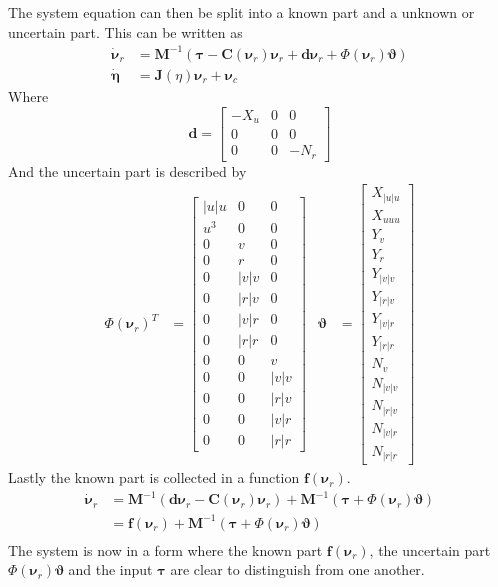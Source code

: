 \documentclass[12pt,a4]{article}
\begin{document}
The system equation can then be split into a known part and a unknown or uncertain part. This can be written as
\begin{align}
	\bm{\dot{\nu}}_r & = \bm{M}^{-1} (\bm{\tau} -\bm{C}(\bm{\nu}_r)\bm{\nu}_r + \bm{d} \bm{\nu}_r + \Phi(\bm{\nu}_r )\bm{\vartheta}) \\
	\bm{\dot{\eta}}  & = \bm{J}(\eta)\bm{\nu}_r + \bm{\nu}_c
\end{align}
Where
\begin{equation}
	\bm{d} = \begin{bmatrix}
		-X_u & 0 & 0    \\
		0    & 0 & 0    \\
		0    & 0 & -N_r
	\end{bmatrix}
\end{equation}
And the uncertain part is described by
\begin{align}
	\Phi(\bm{\nu}_r)^T & = \begin{bmatrix}
		|u|u & 0 & 0 \\ u^3 & 0 & 0 \\ 0& v &0 \\ 0& r &0 \\ 0&|v|v&0  \\ 0&|r|v&0  \\ 0&|v|r&0  \\ 0&|r|r&0  \\ 0&0& v \\ 0&0& |v|v \\ 0&0&|r|v \\ 0&0&|v|r \\ 0&0&|r|r
	\end{bmatrix}
	                   &
	\bm{\vartheta}     & = \begin{bmatrix}
		X_{|u|u} \\ X_{uuu} \\ Y_v \\ Y_r \\ Y_{|v|v} \\ Y_{|r|v} \\ Y_{|v|r} \\ Y_{|r|r} \\ N_v \\ N_{|v|v} \\ N_{|r|v} \\ N_{|v|r} \\ N_{|r|r}
	\end{bmatrix}
\end{align}
Lastly the known part is collected in a function $\bm{f}(\bm{\nu}_r)$.
\begin{align}
	\bm{\dot{\nu}}_r & = \bm{M}^{-1} (\bm{d} \bm{\nu}_r -\bm{C}(\bm{\nu}_r)\bm{\nu}_r ) + \bm{M}^{-1} (\bm{\tau} + \Phi(\bm{\nu}_r )\bm{\vartheta}) \\
	                 & =  \bm{f}(\bm{\nu}_r) + \bm{M}^{-1} (\bm{\tau} + \Phi(\bm{\nu}_r )\bm{\vartheta})                                            \\
\end{align}
The system is now in a form where the known part $\bm{f}(\bm{\nu}_r)$, the uncertain part $\Phi(\bm{\nu}_r )\bm{\vartheta}$ and the input $\bm{\tau}$
are clear to distinguish from one another.
\end{document}
